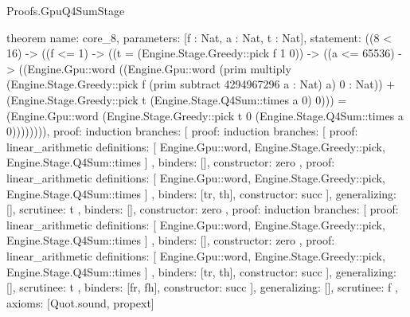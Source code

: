 \begin{lexlean}{Proofs.GpuQ4SumStage}
\begin{semanticmodule}
theorem{
  name: core_8,
  parameters: [f : Nat, a : Nat, t : Nat],
  statement: ((8 < 16) -> ((f <= 1) -> ((t = (Engine.Stage.Greedy::pick f 1 0)) -> ((a <= 65536) -> ((Engine.Gpu::word ((Engine.Gpu::word (prim multiply (Engine.Stage.Greedy::pick f (prim subtract 4294967296 a : Nat) a) 0 : Nat)) + (Engine.Stage.Greedy::pick t (Engine.Stage.Q4Sum::times a 0) 0))) = (Engine.Gpu::word (Engine.Stage.Greedy::pick t 0 (Engine.Stage.Q4Sum::times a 0)))))))),
  proof: induction{
    branches: [
      {
        proof: induction{
          branches: [
            {
              proof: linear_arithmetic{
                definitions: [
                  Engine.Gpu::word,
                  Engine.Stage.Greedy::pick,
                  Engine.Stage.Q4Sum::times
                ]
              },
              binders: [],
              constructor: zero
            },
            {
              proof: linear_arithmetic{
                definitions: [
                  Engine.Gpu::word,
                  Engine.Stage.Greedy::pick,
                  Engine.Stage.Q4Sum::times
                ]
              },
              binders: [tr, th],
              constructor: succ
            }
          ],
          generalizing: [],
          scrutinee: t
        },
        binders: [],
        constructor: zero
      },
      {
        proof: induction{
          branches: [
            {
              proof: linear_arithmetic{
                definitions: [
                  Engine.Gpu::word,
                  Engine.Stage.Greedy::pick,
                  Engine.Stage.Q4Sum::times
                ]
              },
              binders: [],
              constructor: zero
            },
            {
              proof: linear_arithmetic{
                definitions: [
                  Engine.Gpu::word,
                  Engine.Stage.Greedy::pick,
                  Engine.Stage.Q4Sum::times
                ]
              },
              binders: [tr, th],
              constructor: succ
            }
          ],
          generalizing: [],
          scrutinee: t
        },
        binders: [fr, fh],
        constructor: succ
      }
    ],
    generalizing: [],
    scrutinee: f
  },
  axioms: [Quot.sound, propext]
}


\end{semanticmodule}
\end{lexlean}
